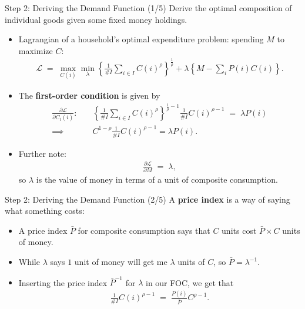 \documentclass[10pt,c,aspectratio=1610,handout]{beamer}
\begin{document}
\begin{frame}{Step 2: Deriving the Demand Function (1/5)}%
  Derive the optimal composition of individual goods given some fixed money holdings.%
  \pause%
  \begin{itemize}%
    \item[$\blacktriangleright$] Lagrangian of a household's optimal expenditure problem: spending $M$ to maximize $C$:%
    \begin{align*}%
      \mathcal{L} \; = \; \max_{C(i)}\min_{\lambda} \left\{ \frac{1}{\#I}\sum_{i\in I}C(i)^{\rho} \right\}^{\frac{1}{\rho}} + \lambda \left\{ M-\sum_{i}P(i)C(i) \right\}.%
    \end{align*}%
    \pause%
    \item[$\blacktriangleright$] The \textbf{first-order condition} is given by%
    \begin{align*}%
      \frac{\partial \mathcal{L}}{\partial C_t(i)}: & \quad \left\{ \frac{1}{\#I} \sum_{i \in I}C(i)^{\rho} \right\}^{\frac{1}{\rho}-1} \frac{1}{\#I}C(i)^{\rho-1} \; = \; \lambda P(i)\\%
      \implies \quad & \quad C^{1-\rho} \frac{1}{\#I}C(i)^{\rho-1} = \lambda P(i).%
    \end{align*}%
    \pause%
    \item[$\blacktriangleright$] Further note:%
    \begin{align*}%
      \frac{\partial \mathcal{L}}{\partial M} \; = \; \lambda,%
    \end{align*}%
    so $\lambda$ is the value of money in terms of a unit of composite consumption.%
  \end{itemize}%
\end{frame}%
\begin{frame}{Step 2: Deriving the Demand Function (2/5)}%
  A \textbf{price index} is a way of saying what something costs:%
  \pause%
  \begin{itemize}%
    \item[$\blacktriangleright$] A price index $\bar P$ for composite consumption says that $C$ units cost $\bar P \times C$ units of money.%
    \pause%
    \item[$\blacktriangleright$] While $\lambda$ says $1$ unit of money will get me $\lambda$ units of $C$, so $\bar P = \lambda^{-1}$.%
    \pause%
    \item[$\Rightarrow$] Inserting the price index $\bar{P}^{-1}$ for $\lambda $ in our FOC, we get that%
    \begin{align}%
      \frac{1}{\#I}C(i)^{\rho -1} \; = \; \frac{P(i)}{\bar{P}}C^{\rho -1}.\label{eq:demand_function_1}%
    \end{align}%
  \end{itemize}%
\end{frame}%
\end{document}
